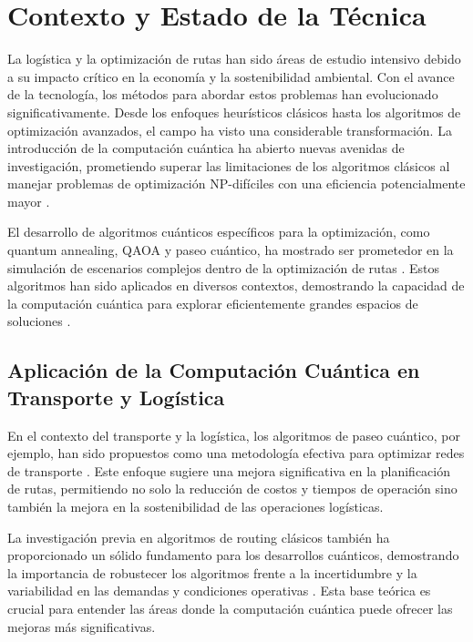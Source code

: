 \documentclass[11pt,a4paper,spanish]{book}
\begin{document}
\chapter{Contexto y Estado de la Técnica}

La logística y la optimización de rutas han sido áreas de estudio intensivo debido a su impacto crítico en la economía y la sostenibilidad ambiental. Con el avance de la tecnología, los métodos para abordar estos problemas han evolucionado significativamente. Desde los enfoques heurísticos clásicos hasta los algoritmos de optimización avanzados, el campo ha visto una considerable transformación. La introducción de la computación cuántica ha abierto nuevas avenidas de investigación, prometiendo superar las limitaciones de los algoritmos clásicos al manejar problemas de optimización NP-difíciles con una eficiencia potencialmente mayor \citep{nielsenChuang}.

El desarrollo de algoritmos cuánticos específicos para la optimización, como quantum annealing, QAOA y paseo cuántico, ha mostrado ser prometedor en la simulación de escenarios complejos dentro de la optimización de rutas . Estos algoritmos han sido aplicados en diversos contextos, demostrando la capacidad de la computación cuántica para explorar eficientemente grandes espacios de soluciones \citep{QWalk-Based}.

\section{Aplicación de la Computación Cuántica en Transporte y Logística}

En el contexto del transporte y la logística, los algoritmos de paseo cuántico, por ejemplo, han sido propuestos como una metodología efectiva para optimizar redes de transporte \citep{quantumTransportOpt}. Este enfoque sugiere una mejora significativa en la planificación de rutas, permitiendo no solo la reducción de costos y tiempos de operación sino también la mejora en la sostenibilidad de las operaciones logísticas.

La investigación previa en algoritmos de routing clásicos también ha proporcionado un sólido fundamento para los desarrollos cuánticos, demostrando la importancia de robustecer los algoritmos frente a la incertidumbre y la variabilidad en las demandas y condiciones operativas \citep{transportationScience}. Esta base teórica es crucial para entender las áreas donde la computación cuántica puede ofrecer las mejoras más significativas.
\end{document}
